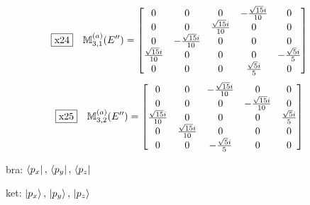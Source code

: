 \documentclass[fleqn,10pt,landscape]{jsarticle}
\begin{document}
\begin{dmath*}
\fbox{x24}\quad \mathbb{M}_{3,1}^{(a)}(E^{\prime\prime})=\begin{bmatrix} 0 & 0 & 0 & - \frac{\sqrt{15} i}{10} & 0 \\ 0 & 0 & \frac{\sqrt{15} i}{10} & 0 & 0 \\ 0 & - \frac{\sqrt{15} i}{10} & 0 & 0 & 0 \\ \frac{\sqrt{15} i}{10} & 0 & 0 & 0 & - \frac{\sqrt{5} i}{5} \\ 0 & 0 & 0 & \frac{\sqrt{5} i}{5} & 0 \end{bmatrix}
\end{dmath*}
\begin{dmath*}
\fbox{x25}\quad \mathbb{M}_{3,2}^{(a)}(E^{\prime\prime})=\begin{bmatrix} 0 & 0 & - \frac{\sqrt{15} i}{10} & 0 & 0 \\ 0 & 0 & 0 & - \frac{\sqrt{15} i}{10} & 0 \\ \frac{\sqrt{15} i}{10} & 0 & 0 & 0 & \frac{\sqrt{5} i}{5} \\ 0 & \frac{\sqrt{15} i}{10} & 0 & 0 & 0 \\ 0 & 0 & - \frac{\sqrt{5} i}{5} & 0 & 0 \end{bmatrix}
\end{dmath*}
\vspace{5mm}

\noindent\textbullet\, bra: $\bra{p_{x}},\, \bra{p_{y}},\, \bra{p_{z}}$

\noindent\textbullet\, ket: $\ket{p_{x}},\, \ket{p_{y}},\, \ket{p_{z}}$
\end{document}
